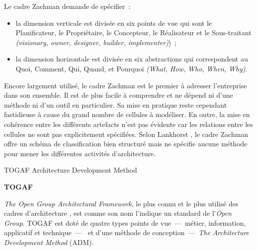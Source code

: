 Le cadre Zachman demande de spécifier~:

	\begin{itemize}

\item la dimension verticale est divisée en six points de vue qui sont le Planificateur, le Propriétaire, le Concepteur, le Réalisateur et le Sous-traitant \textit{(visionary, owner, designer, builder, implementer)})~;

\item la dimension horizontale est divisée en six abstractions qui correspondent au Quoi, Comment, Qui, Quand, et Pourquoi \textit{(What, How, Who, When, Why)}.
	\end{itemize}	

Encore largement utilisé, le cadre Zachman est le premier à adresser l'entreprise dans son ensemble. Il est de plus facile à comprendre et ne dépend ni d'une méthode ni d'un outil en particulier. Sa mise en pratique reste cependant fastidieuse à cause du grand nombre de cellules à modéliser. En outre, la mise en cohérence entre les différents artefacts n'est pas évidente car les relations entre les cellules ne sont pas explicitement spécifiées. Selon Lankhorst \cite{lankhorst2013enterprise}, le cadre Zachman offre un schéma de classification bien structuré mais ne spécifie aucune méthode pour mener les différentes activités d'architecture.

\begin{table}[!htbp]
    \vspace*{0.4cm}
    
 \caption{TOGAF Architecture Development Method  \protect\cite{zachman1987framework}}
 \label{fig:Zachman}
\end{table}

\textbf{TOGAF} 

\textit{The Open Group Architectural Framework}, le plus connu et le plus utilisé des cadres d'architecture \cite{winter2008enterprise}, est comme son nom l'indique un standard de l'\textit{Open Group}. TOGAF est doté de quatre types points de vue~—~métier, information, applicatif et technique~—~ et d'une méthode de conception~—~\textit{The Architecture Development Method} (ADM). 

